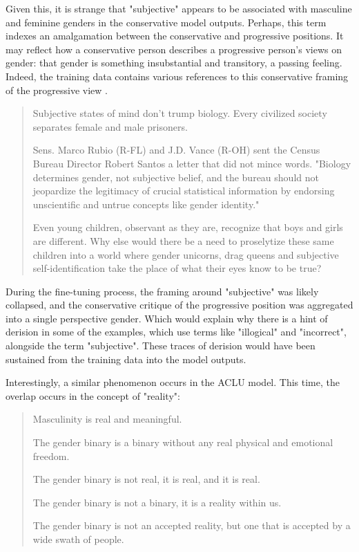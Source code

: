 \documentclass[anonymous,review]{acmart}
\begin{document}
Given this, it is strange that "subjective" appears to be associated with masculine and feminine genders in the conservative model outputs. Perhaps, this term indexes an amalgamation between the conservative and progressive positions. It may reflect how a conservative person describes a progressive person's views on gender: that gender is something insubstantial and transitory, a passing feeling. Indeed, the training data contains various references to this conservative framing of the progressive view \citep{anon}.

\begin{quote}
Subjective states of mind don't trump biology. Every civilized society separates female and male prisoners.

Sens. Marco Rubio (R-FL) and J.D. Vance (R-OH) sent the Census Bureau Director Robert Santos a letter that did not mince words. "Biology determines gender, not subjective belief, and the bureau should not jeopardize the legitimacy of crucial statistical information by endorsing unscientific and untrue concepts like gender identity."

Even young children, observant as they are, recognize that boys and girls are different. Why else would there be a need to proselytize these same children into a world where gender unicorns, drag queens and subjective self-identification take the place of what their eyes know to be true?
\end{quote}

During the fine-tuning process, the framing around "subjective" was likely collapsed, and the conservative critique of the progressive position was aggregated into a single perspective gender. Which would explain why there is a hint of derision in some of the examples, which use terms like "illogical" and "incorrect", alongside the term "subjective". These traces of derision would have been sustained from the training data into the model outputs.

Interestingly, a similar phenomenon occurs in the ACLU model. This time, the overlap occurs in the concept of "reality":

\begin{quote}
Masculinity is real and meaningful.

The gender binary is a binary without any real physical and emotional freedom.

The gender binary is not real, it is real, and it is real.

The gender binary is not a binary, it is a reality within us.

The gender binary is not an accepted reality, but one that is accepted
by a wide swath of people.
\end{quote}
\end{document}
